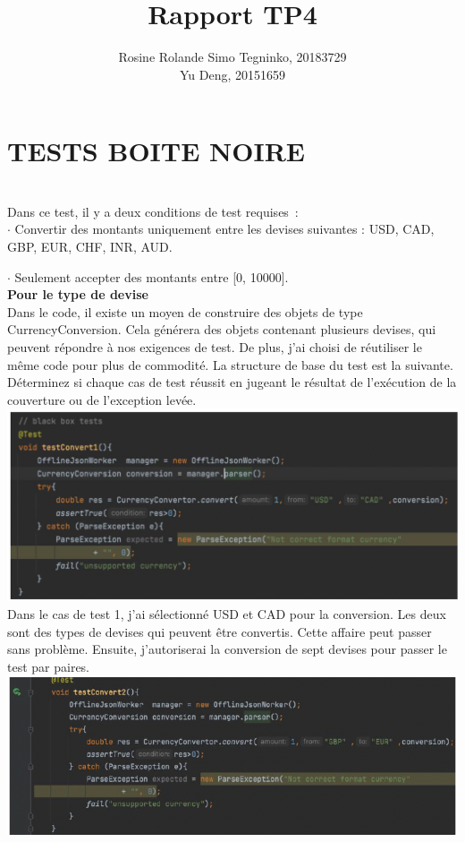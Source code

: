 \documentclass{article}
\title{Rapport TP4}
\author{Rosine Rolande Simo Tegninko, 20183729\\
Yu Deng, 20151659}
\date{}
\begin{document}
\maketitle

\section*{TESTS BOITE NOIRE}\\

Dans ce test, il y a deux conditions de test requises :\\

$\cdot$ Convertir des montants uniquement entre les devises suivantes : USD, CAD, GBP, EUR, CHF, INR, AUD.

$\cdot$ Seulement accepter des montants entre [0, 10000].\\

\textbf{Pour le type de devise}\\

Dans le code, il existe un moyen de construire des objets de type CurrencyConversion. Cela générera des objets contenant plusieurs devises, qui peuvent répondre à nos exigences de test. De plus, j'ai choisi de réutiliser le même code pour plus de commodité. La structure de base du test est la suivante. Déterminez si chaque cas de test réussit en jugeant le résultat de l'exécution de la couverture ou de l'exception levée.\\
\includegraphics[scale=0.5]{G1.png}\\

Dans le cas de test 1, j'ai sélectionné USD et CAD pour la conversion. Les deux sont des types de devises qui peuvent être convertis. Cette affaire peut passer sans problème. Ensuite, j'autoriserai la conversion de sept devises pour passer le test par paires.\\
\includegraphics[scale=0.7]{G2.png}\\
\end{document}
